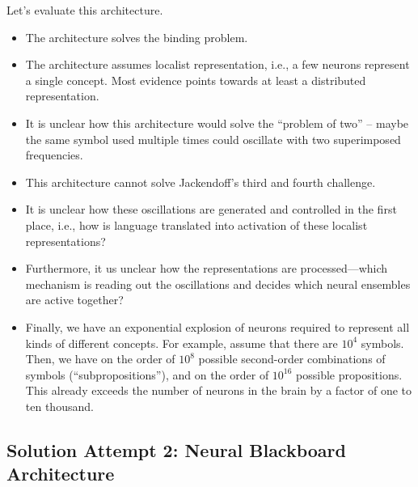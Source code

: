 \documentclass[10pt,letterpaper,oneside]{article}
\begin{document}
Let's evaluate this architecture.
\begin{itemize}
	\item[\OPlus] The architecture solves the binding problem.
	\item[\OMeh] The architecture assumes localist representation, i.e., a few neurons represent a single concept. Most evidence points towards at least a distributed representation.
	\item[\OMeh] It is unclear how this architecture would solve the \enquote{problem of two} -- maybe the same symbol used multiple times could oscillate with two superimposed frequencies.
	\item[\OMeh] This architecture cannot solve Jackendoff's third and fourth challenge.
	\item[\OMinus] It is unclear how these oscillations are generated and controlled in the first place, i.e., how is language translated into activation of these localist representations?
	\item[\OMinus] Furthermore, it us unclear how the representations are processed---which mechanism is reading out the oscillations and decides which neural ensembles are active together?
	\item[\OMinus] Finally, we have an exponential explosion of neurons required to represent all kinds of different concepts. For example, assume that there are $10^4$ symbols. Then, we have on the order of $10^8$ possible second-order combinations of symbols (\enquote{subpropositions}), and on the order of $10^{16}$ possible propositions. This already exceeds the number of neurons in the brain by a factor of one to ten thousand.
\end{itemize}

\subsection{Solution Attempt 2: Neural Blackboard Architecture}
\end{document}
